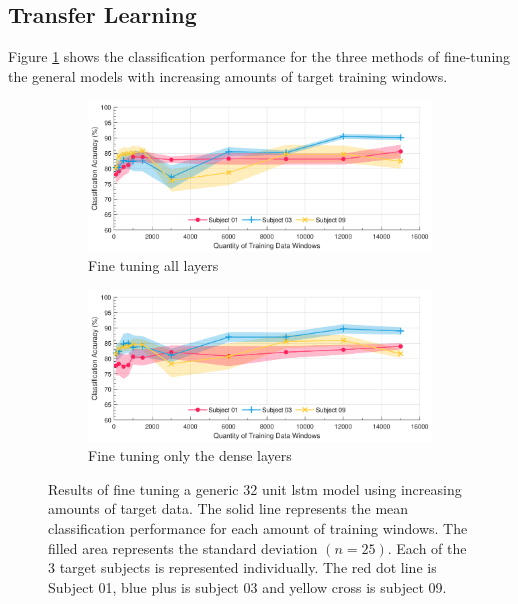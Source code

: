 \subsection{Transfer Learning}
Figure \ref{fig:ch5_pretrained_model} shows the classification performance for the three methods of fine-tuning the general models with increasing amounts of target training windows.

\begin{figure}[htbp]
    \centering
    \begin{subfigure}{\textwidth}
        \centering
        \includegraphics[width=\textwidth]{content/5-Personalisation/ch5_pre_trained_model_accuracy.pdf}
        \caption{Fine tuning all layers}
    \end{subfigure}
    \begin{subfigure}{\textwidth}
        \centering
        \includegraphics[width=\textwidth]{content/5-Personalisation/ch5_frozen_lstm_layer_accuracy.pdf}
        \caption{Fine tuning only the dense layers}
    \end{subfigure}
    \caption[Results of fine tuning a generic 32 unit  model using increasing amounts of target data]{Results of fine tuning a generic 32 unit \acrshort{lstm} model using increasing amounts of target data. The solid line represents the mean classification performance for each amount of training windows. The filled area represents the standard deviation $(n=25)$. Each of the 3 target subjects is represented individually. The red dot line is Subject 01, blue plus is subject 03 and yellow cross is subject 09.}
    \label{fig:ch5_pretrained_model}
\end{figure}
